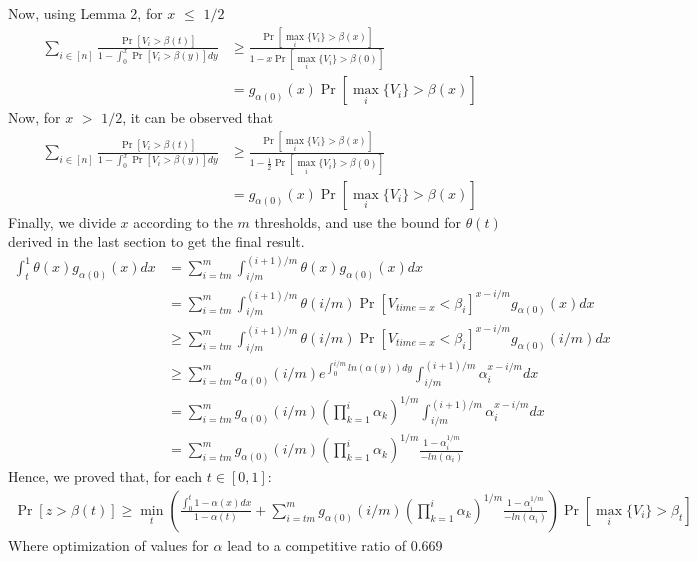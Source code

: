 \documentclass[10pt, letterpaper, twoside]{article}
\begin{document}
	Now, using Lemma 2, for $x$ $\leq$ $1/2$
	\begin{align*}
		\sum_{i \in [n]} \frac{\Pr[V_{i} > \beta(t)]}{1 - \int_{0}^{x} \Pr[V_{i} > \beta(y)] dy} &\geq \frac{\Pr[\max_{i} \{V_{i}\} > \beta(x)]}{1-x\Pr[\max_{i} \{V_{i}\} > \beta(0)]}\\
		&= g_{\alpha(0)} (x) \Pr[\max_{i} \{V_{i}\} > \beta(x)]
	\end{align*}
	Now, for $x$ $>$ $1/2$, it can be observed that \\
	\begin{align*}
		\sum_{i \in [n]} \frac{\Pr[V_{i} > \beta(t)]}{1 - \int_{0}^{x} \Pr[V_{i} > \beta(y)] dy} &\geq \frac{\Pr[\max_{i} \{V_{i}\} > \beta(x)]}{1-\frac{1}{2}\Pr[\max_{i} \{V_{i}\} > \beta(0)]} \\
		&= g_{\alpha(0)} (x) \Pr[\max_{i} \{V_{i}\} > \beta(x)]
	\end{align*}
	Finally, we divide $x$ according to the $m$ thresholds, and use the bound for $\theta(t)$ derived in the last section to get the final result.
	\begin{align*}
		\int_{t}^{1} \theta(x) g_{\alpha(0)} (x) dx &= \sum_{i = tm}^{m} \int_{i/m}^{(i+1)/m} \theta(x) g_{\alpha(0)} (x) dx\\
		&= \sum_{i = tm}^{m} \int_{i/m}^{(i+1)/m} \theta(i/m) \Pr[V_{time=x} < \beta_{i}]^{x - i/m} g_{\alpha(0)} (x) dx\\
		&\geq \sum_{i = tm}^{m} \int_{i/m}^{(i+1)/m} \theta(i/m) \Pr[V_{time=x} < \beta_{i}]^{x - i/m} g_{\alpha(0)} (i/m) dx\\
		&\geq \sum_{i = tm}^{m} g_{\alpha(0)}(i/m) e^{\int_{0}^{i/m} ln(\alpha(y)) dy} \int_{i/m}^{(i+1)/m} \alpha_{i}^{x - i/m}  dx\\
		&= \sum_{i = tm}^{m} g_{\alpha(0)}(i/m) (\prod_{k=1}^{i} \alpha_{k})^{1/m} \int_{i/m}^{(i+1)/m} \alpha_{i}^{x - i/m}  dx\\
		&= \sum_{i = tm}^{m} g_{\alpha(0)}(i/m) (\prod_{k=1}^{i} \alpha_{k})^{1/m} \frac{1 - \alpha_{i} ^ {1/m}}{-ln(\alpha_{i})}
	\end{align*}
	Hence, we proved that, for each $t \in [0,1]$:
	\begin{align*}
		\Pr[z > \beta(t)] \geq \min_{t}\left(\frac{\int_{0}^{t} 1 - \alpha(x) dx}{1-\alpha(t)} + \sum_{i = tm}^{m} g_{\alpha(0)}(i/m) (\prod_{k=1}^{i} \alpha_{k})^{1/m} \frac{1 - \alpha_{i} ^ {1/m}}{-ln(\alpha_{i})}\right) \Pr[\max_{i} \{V_{i}\} > \beta_{t}]
	\end{align*}
	Where optimization of values for $\alpha$ lead to a competitive ratio of 0.669
\end{document}

